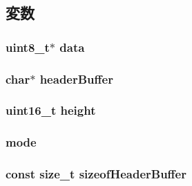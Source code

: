 \subsection{変数}
\hypertarget{classBitmap_abe222f6d3581e7920dcad5306cc906a8}{
\subsubsection[{data}]{\setlength{\rightskip}{0pt plus 5cm}uint8\_\-t$\ast$ {\bf data}}}
\label{classBitmap_abe222f6d3581e7920dcad5306cc906a8}
\hypertarget{classBitmap_a5ae882f02e94df66131138319e712c96}{
\subsubsection[{headerBuffer}]{\setlength{\rightskip}{0pt plus 5cm}char$\ast$ {\bf headerBuffer}}}
\label{classBitmap_a5ae882f02e94df66131138319e712c96}
\hypertarget{classBitmap_a81c9f8d0b8c3b49d770be14dbe9f0d37}{
\subsubsection[{height}]{\setlength{\rightskip}{0pt plus 5cm}uint16\_\-t {\bf height}}}
\label{classBitmap_a81c9f8d0b8c3b49d770be14dbe9f0d37}
\hypertarget{classBitmap_a04dbb1673fce676e164d63b34f561279}{
\subsubsection[{mode}]{ {\bf mode}}}
\label{classBitmap_a04dbb1673fce676e164d63b34f561279}
\hypertarget{classBitmap_aa659ac1e8f41fbbeff951253e434390f}{
\subsubsection[{sizeofHeaderBuffer}]{\setlength{\rightskip}{0pt plus 5cm}const size\_\-t {\bf sizeofHeaderBuffer}}}
